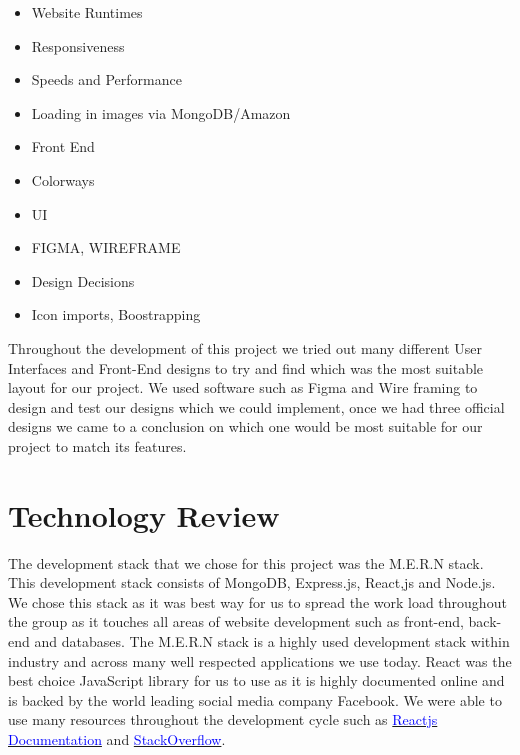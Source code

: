 \newline

\begin{itemize}
    \item Website Runtimes
    \item Responsiveness
    \item Speeds and Performance
    \item Loading in images via MongoDB/Amazon
\end{itemize}


\begin{itemize}
    \item Front End
    \item Colorways
    \item UI
    \item FIGMA, WIREFRAME
    \item Design Decisions
    \item Icon imports, Boostrapping
\end{itemize}

Throughout the development of this project we tried out many different User Interfaces and Front-End designs to try and find which was the most suitable layout for our project. We used software such as Figma and Wire framing to design and test our designs which we could implement, once we had three official designs we came to a conclusion on which one would be most suitable for our project to match its features.

\chapter{Technology Review}

The development stack that we chose for this project was the M.E.R.N stack. This development stack consists of MongoDB, Express.js, React,js and Node.js. We chose this stack as it was best way for us to spread the work load throughout the group as it touches all areas of website development such as front-end, back-end and databases. The M.E.R.N stack is a highly used development stack within industry and across many well respected applications we use today. React was the best choice JavaScript library for us to use as it is highly documented online and is backed by the world leading social media company Facebook. We were able to use many resources throughout the development cycle such as \href{https://reactjs.org/}{\textcolor{blue}{Reactjs Documentation}} and \href{https://stackoverflow.com/}{\textcolor{blue}{StackOverflow}}.

